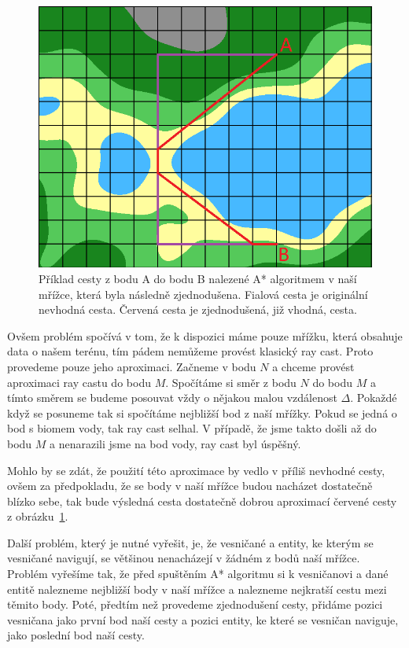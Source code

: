\begin{figure}[!htb]
    \centering
    \includegraphics[width=0.66\linewidth]{img/path_simplified.png}
    \caption{Příklad cesty z bodu A do bodu B nalezené A* algoritmem v naší mřížce, která byla následně zjednodušena. Fialová cesta je originální nevhodná cesta. Červená cesta je zjednodušená, již vhodná, cesta.}
    \label{fig:path_simplified}
\end{figure}

Ovšem problém spočívá v tom, že k dispozici máme pouze mřížku, která obsahuje data o našem terénu, tím pádem nemůžeme provést klasický ray cast. Proto provedeme pouze jeho aproximaci. Začneme v bodu $N$ a chceme provést aproximaci ray castu do bodu $M$. Spočítáme si směr z bodu $N$ do bodu $M$ a tímto směrem se budeme posouvat vždy o nějakou malou vzdálenost $\Delta$. Pokaždé když se posuneme tak si spočítáme nejbližší bod z naší mřížky. Pokud se jedná o bod s biomem vody, tak ray cast selhal. V případě, že jsme takto došli až do bodu $M$ a nenarazili jsme na bod vody, ray cast byl úspěšný.

Mohlo by se zdát, že použití této aproximace by vedlo v příliš nevhodné cesty, ovšem za předpokladu, že se body v naší mřížce budou nacházet dostatečně blízko sebe, tak bude výsledná cesta dostatečně dobrou aproximací červené cesty z obrázku~\ref{fig:path_simplified}.

Další problém, který je nutné vyřešit, je, že vesničané a entity, ke kterým se vesničané navigují, se většinou nenacházejí v žádném z bodů naší mřížce. Problém vyřešíme tak, že před spuštěním A* algoritmu si k vesničanovi a dané entitě nalezneme nejbližší body v naší mřížce a nalezneme nejkratší cestu mezi těmito body. Poté, předtím než provedeme zjednodušení cesty, přidáme pozici vesničana jako první bod naší cesty a pozici entity, ke které se vesničan naviguje, jako poslední bod naší cesty.

